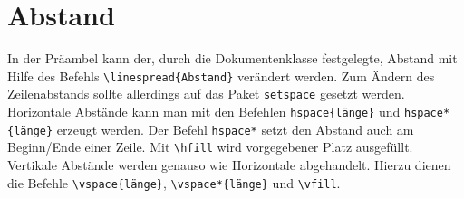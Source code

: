 \chapter{Abstand}
In der Präambel kann der, durch die Dokumentenklasse festgelegte, Abstand mit Hilfe des Befehls \verb=\linespread{Abstand}= verändert werden. Zum Ändern des Zeilenabstands sollte allerdings auf das Paket \verb=setspace= gesetzt werden.\\[1em]
Horizontale Abstände kann man mit den Befehlen \verb=hspace{länge}= und \verb=hspace*{länge}= erzeugt werden. Der Befehl \verb=hspace*= setzt den Abstand auch am Beginn/Ende einer Zeile. Mit \verb=\hfill= wird vorgegebener Platz ausgefüllt.\\[1em]
Vertikale Abstände werden genauso wie Horizontale abgehandelt. Hierzu dienen die Befehle \verb=\vspace{länge}=, \verb=\vspace*{länge}= und \verb=\vfill=.
